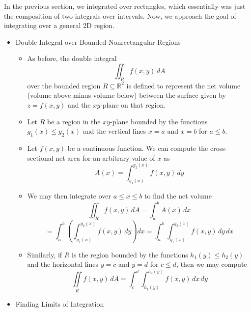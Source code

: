 \documentclass[12pt]{article}
\theoremstyle{plain}
\theoremstyle{definition}
\theoremstyle{remark}
\begin{document}
	In the previous section, we integrated over rectangles, which essentially was just the composition of two integrals over intervals. Now, we approach the goal of integrating over a general 2D region.
	
	\begin{itemize}
	
	\item Double Integral over Bounded Nonrectangular Regions
	
		\begin{itemize}
		\item As before, the double integral \[\iint_R f(x,y)\, dA\] over the bounded region $R \subseteq \mathbb{R}^2$ is defined to represent the net volume (volume above minus volume below) between the surface given by $z=f(x,y)$ and the $xy$-plane on that region.
		\item Let $R$ be a region in the $xy$-plane bounded by the functions $g_1(x)\leq g_2(x)$ and the vertical lines $x=a$ and $x=b$ for $a\leq b$.
		\item Let $f(x,y)$ be a continuous function. We can compute the cross-sectional net area for an arbitrary value of $x$ as \[A(x) = \int_{g_1(x)}^{g_2(x)} f(x,y)\, dy\]
		\item We may then integrate over $a\leq x\leq b$ to find the net volume \[\iint_R f(x,y)\, dA = \int_a^b A(x)\,dx \]\[= \int_a^b\left(\int_{g_1(x)}^{g_2(x)} f(x,y)\,dy\right)dx=\int_a^b\int_{g_1(x)}^{g_2(x)} f(x,y)\,dy\,dx\]
		\item Similarly, if $R$ is the region bounded by the functions $h_1(y)\leq h_2(y)$ and the horizontal lines $y=c$ and $y=d$ for $c\leq d$, then we may compute \[\iint\limits_R f(x,y) \,dA = \int_c^d\int_{h_1(y)}^{h_2(y)} f(x,y) \, dx \, dy\]
		\end{itemize}
	\newpage
	\item Finding Limits of Integration
	

\end{itemize}
\end{document}
